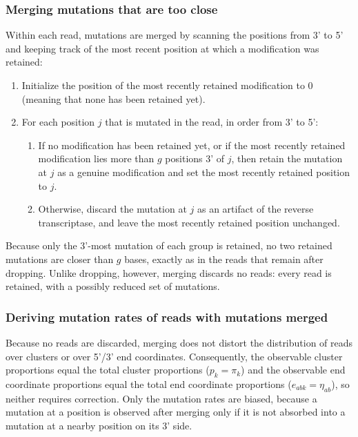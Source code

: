 \documentclass{article}
\begin{document}
\subsubsection{Merging mutations that are too close}
\label{merge-close-muts}

Within each read, mutations are merged by scanning the positions from 3' to 5' and keeping track of the most recent position at which a modification was retained:
\begin{enumerate}
    \item Initialize the position of the most recently retained modification to 0 (meaning that none has been retained yet).
    \item For each position $j$ that is mutated in the read, in order from 3' to 5':
    \begin{enumerate}
        \item If no modification has been retained yet, or if the most recently retained modification lies more than $g$ positions 3' of $j$, then retain the mutation at $j$ as a genuine modification and set the most recently retained position to $j$.
        \item Otherwise, discard the mutation at $j$ as an artifact of the reverse transcriptase, and leave the most recently retained position unchanged.
    \end{enumerate}
\end{enumerate}
Because only the 3'-most mutation of each group is retained, no two retained mutations are closer than $g$ bases, exactly as in the reads that remain after dropping.
Unlike dropping, however, merging discards no reads: every read is retained, with a possibly reduced set of mutations.

\subsubsection{Deriving mutation rates of reads with mutations merged}
\label{calc-p-mut-merged}

Because no reads are discarded, merging does not distort the distribution of reads over clusters or over 5'/3' end coordinates.
Consequently, the observable cluster proportions equal the total cluster proportions ($p_k = \pi_k$) and the observable end coordinate proportions equal the total end coordinate proportions ($e_{abk} = \eta_{ab}$), so neither requires correction.
Only the mutation rates are biased, because a mutation at a position is observed after merging only if it is not absorbed into a mutation at a nearby position on its 3' side.
\end{document}
